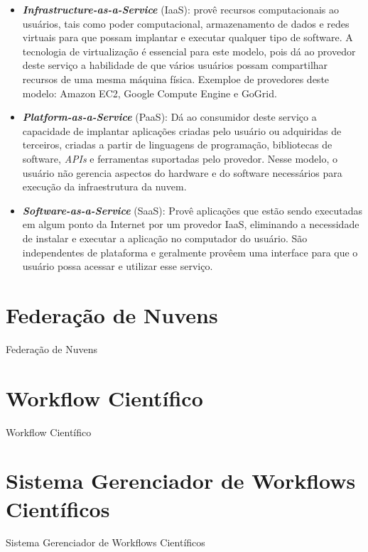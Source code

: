 \begin{itemize}
	\item \textbf{\textit{Infrastructure-as-a-Service}} (IaaS): provê recursos computacionais ao usuários, tais como poder computacional, armazenamento de dados e redes virtuais para que possam implantar e executar qualquer tipo de software. A tecnologia de virtualização é essencial para este modelo, pois dá ao provedor deste serviço a habilidade de que vários usuários possam compartilhar recursos de uma mesma máquina física. Exemploe de provedores deste modelo: Amazon EC2, Google Compute Engine e GoGrid.
	\item \textit{\textbf{Platform-as-a-Service}} (PaaS): Dá ao consumidor deste serviço a capacidade de implantar aplicações criadas pelo usuário ou adquiridas de terceiros, criadas a partir de linguagens de programação, bibliotecas de software, \textit{APIs} e ferramentas suportadas pelo provedor. Nesse modelo, o usuário não gerencia aspectos do hardware e do software necessários para execução da infraestrutura da nuvem.
	\item \textit{\textbf{Software-as-a-Service}} (SaaS): 	Provê aplicações que estão sendo executadas em algum ponto da Internet por um provedor IaaS, eliminando a necessidade de instalar e executar a aplicação no computador do usuário. São independentes de plataforma e geralmente provêem uma interface para que o usuário possa acessar e utilizar esse serviço.
\end{itemize}

\section{Federação de Nuvens} \label{cap2sec3}

Federação de Nuvens

\section{Workflow Científico} \label{cap2sec4}

Workflow Científico

\section{Sistema Gerenciador de Workflows Científicos} \label{cap2sec5}

Sistema Gerenciador de Workflows Científicos